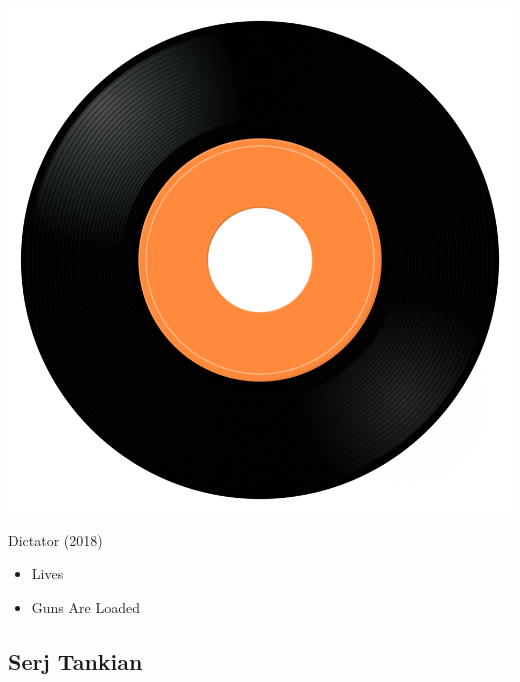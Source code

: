 \begin{minipage}[t]{0.25\textwidth}\vspace{0pt}
\captionsetup{type=figure}
\includegraphics[width=\textwidth]{Images/cover.png}
\caption*{Dictator (2018)}
\end{minipage}
\begin{minipage}[t]{0.25\textwidth}\vspace{0pt}
\begin{itemize}[nosep,leftmargin=1em,labelwidth=*,align=left]
	\setlength{\itemsep}{0pt}
	\item Lives
	\item Guns Are Loaded
\end{itemize}
\end{minipage}

\subsection{Serj Tankian}


